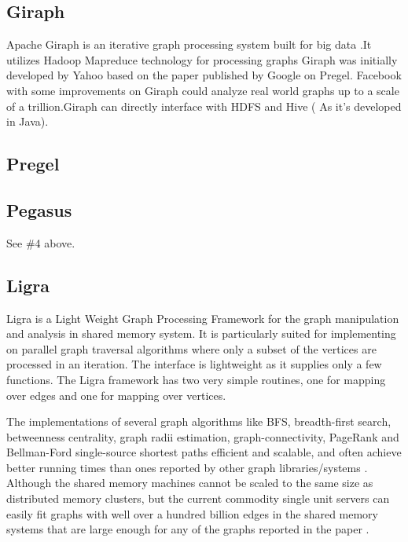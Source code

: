\subsection{ Giraph}

     Apache Giraph is an iterative graph processing system built for big
     data \cite{www-giraph-apache}.It utilizes Hadoop Mapreduce
     technology for processing graphs \cite{www-apache-giraph-wiki}
     Giraph was initially developed by Yahoo based on the paper
     published by Google on Pregel. \cite{www-apache-giraph-pcworld}
     Facebook with some improvements on Giraph could analyze real world
     graphs up to a scale of a trillion.Giraph can directly interface
     with HDFS and Hive ( As it's developed in
     Java). \cite{www-apache-giraph-fb}
   
\subsection{ Pregel}
\subsection{ Pegasus}

     See \#4 above.

\subsection{ Ligra}

     Ligra is a Light Weight Graph Processing Framework for the graph
     manipulation and analysis in shared memory system. It is
     particularly suited for implementing on parallel graph traversal
     algorithms where only a subset of the vertices are processed in an
     iteration. The interface is lightweight as it supplies only a
     few functions. The Ligra framework has two very simple routines,
     one for mapping over edges and one for mapping over vertices.

     The implementations of several graph algorithms like BFS,
     breadth-first search, betweenness centrality, graph radii
     estimation, graph-connectivity, PageRank and Bellman-Ford
     single-source shortest paths efficient and scalable, and often
     achieve better running times than ones reported by other graph
     libraries/systems \cite{ligra-paper-2013}.  Although the shared
     memory machines cannot be scaled to the same size as distributed
     memory clusters, but the current commodity single unit servers
     can easily fit graphs with well over a hundred billion edges in
     the shared memory systems that are large enough for any of the
     graphs reported in the paper \cite{ligra-paper-2}.

